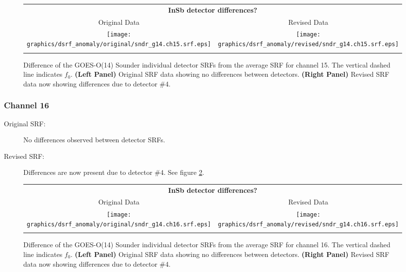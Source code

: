 \begin{figure}[htp]
  \centering
  \begin{tabular}{c c}
    \multicolumn{2}{c}{\textsf{\bfseries InSb detector differences?}} \\
    \hspace{1.5em}\textsf{Original Data} &
    \hspace{1.5em}\textsf{Revised Data} \\
    \texttt{[image: graphics/dsrf\_anomaly/original/sndr\_g14.ch15.srf.eps]} &
    \texttt{[image: graphics/dsrf\_anomaly/revised/sndr\_g14.ch15.srf.eps]} \\\\
  \end{tabular}
  \caption{Difference of the GOES-O(14) Sounder individual detector SRFs from the average SRF for channel 15. The vertical dashed line indicates $f_0$. \textbf{(Left Panel)} Original SRF data showing no differences between detectors. \textbf{(Right Panel)} Revised SRF data now showing differences due to detector \#4.}
  \label{fig:sndr_g14.ch15.dsrf_anomaly}
\end{figure}

\subsubsection{Channel 16}
\begin{description}
  \item[Original SRF:] No differences observed between detector SRFs.
  \item[Revised SRF:]  Differences are now present due to detector \#4. See figure \ref{fig:sndr_g14.ch16.dsrf_anomaly}.
\end{description}

\begin{figure}[htp]
  \centering
  \begin{tabular}{c c}
    \multicolumn{2}{c}{\textsf{\bfseries InSb detector differences?}} \\
    \hspace{1.5em}\textsf{Original Data} &
    \hspace{1.5em}\textsf{Revised Data} \\
    \texttt{[image: graphics/dsrf\_anomaly/original/sndr\_g14.ch16.srf.eps]} &
    \texttt{[image: graphics/dsrf\_anomaly/revised/sndr\_g14.ch16.srf.eps]} \\\\
  \end{tabular}
  \caption{Difference of the GOES-O(14) Sounder individual detector SRFs from the average SRF for channel 16. The vertical dashed line indicates $f_0$. \textbf{(Left Panel)} Original SRF data showing no differences between detectors. \textbf{(Right Panel)} Revised SRF data now showing differences due to detector \#4.}
  \label{fig:sndr_g14.ch16.dsrf_anomaly}
\end{figure}


